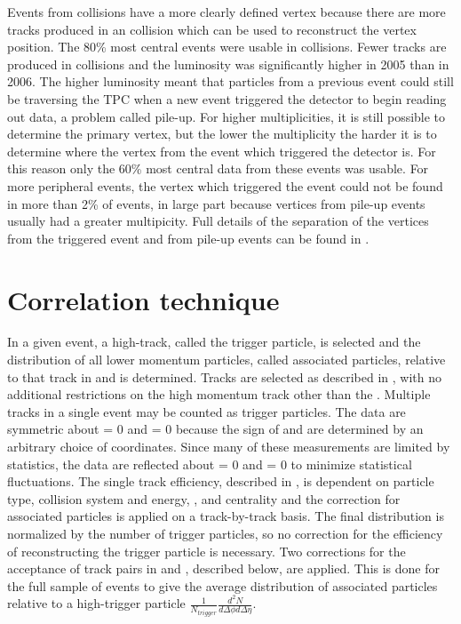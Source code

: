 Events from \Au collisions have a more clearly defined vertex because there are more tracks produced in an \Au collision which can be used to reconstruct the vertex position.  The 80\% most central events were usable in \Au collisions.  Fewer tracks are produced in \Cu collisions and the luminosity was significantly higher in 2005 than in 2006.  The higher luminosity meant that particles from a previous event could still be traversing the TPC when a new event triggered the detector to begin reading out data, a problem called pile-up.  For higher multiplicities, it is still possible to determine the primary vertex, but the lower the multiplicity the harder it is to determine where the vertex from the event which triggered the detector is.  For this reason only the 60\% most central data from these events was usable.  For more peripheral events, the vertex which triggered the event could not be found in more than 2\% of events, in large part because vertices from pile-up events usually had a greater multipicity.  Full details of the separation of the vertices from the triggered event and from pile-up events can be found in \cite{antsthesis}.

\section{Correlation technique \label{CorrTechnique}}
In a given event, a high-\pT track, called the trigger particle, is selected and the distribution of all lower momentum particles, called associated particles, relative to that track in \deta and \dphi is determined.  Tracks are selected as described in , with no additional restrictions on the high momentum track other than the \pT.  Multiple tracks in a single event may be counted as trigger particles.  The data are symmetric about \dphi = 0 and \deta = 0 because the sign of \dphi and \deta are determined by an arbitrary choice of coordinates.  Since many of these measurements are limited by statistics, the data are reflected about \dphi = 0 and \deta = 0 to minimize statistical fluctuations.  The single track efficiency, described in , is dependent on particle type, collision system and energy, \pT, and centrality and the correction for associated particles is applied on a track-by-track basis.  The final distribution is normalized by the number of trigger particles, so no correction for the efficiency of reconstructing the trigger particle is necessary.  Two corrections for the acceptance of track pairs in \dphi and \deta, described below, are applied.  This is done for the full sample of events to give the average distribution of associated particles relative to a high-\pT trigger particle $\frac{1}{N_{trigger}}\frac{d^2N}{d\Delta\phi d\Delta\eta}$.


